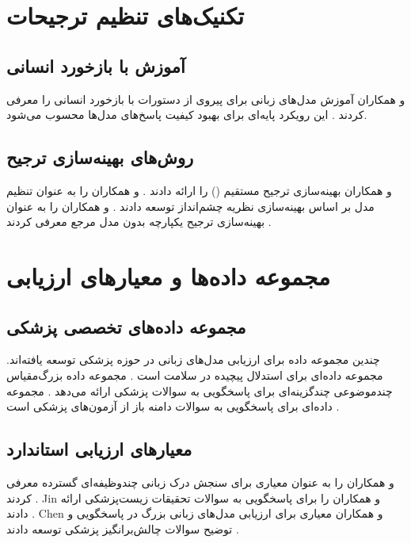 \documentclass[11pt, a4paper, oneside]{book}
\begin{document}
	
	\section{تکنیک‌های تنظیم ترجیحات}
	
	\subsection{آموزش با بازخورد انسانی}
	
	 و همکاران آموزش مدل‌های زبانی برای پیروی از دستورات با بازخورد انسانی را معرفی کردند \cite{ouyang_training_2022}. این رویکرد پایه‌ای برای بهبود کیفیت پاسخ‌های مدل‌ها محسوب می‌شود.
	
	\subsection{روش‌های بهینه‌سازی ترجیح}
	
	 و همکاران بهینه‌سازی ترجیح مستقیم () را ارائه دادند \cite{rafailov_direct_2024}.  و همکاران  را به عنوان تنظیم مدل بر اساس بهینه‌سازی نظریه چشم‌انداز توسعه دادند \cite{ethayarajh_kto_2024}.  و همکاران  را به عنوان بهینه‌سازی ترجیح یکپارچه بدون مدل مرجع معرفی کردند \cite{hong_orpo_2024}.
	
	\section{مجموعه داده‌ها و معیارهای ارزیابی}
	
	\subsection{مجموعه داده‌های تخصصی پزشکی}
	
	چندین مجموعه داده برای ارزیابی مدل‌های زبانی در حوزه پزشکی توسعه یافته‌اند.  مجموعه داده‌ای برای استدلال پیچیده در سلامت است \cite{vilares_head-qa_2019}.  مجموعه داده بزرگ‌مقیاس چندموضوعی چندگزینه‌ای برای پاسخگویی به سوالات پزشکی ارائه می‌دهد \cite{pal_medmcqa_2022}.  مجموعه داده‌ای برای پاسخگویی به سوالات دامنه باز از آزمون‌های پزشکی است \cite{jin_what_2020}.
	
	\subsection{معیارهای ارزیابی استاندارد}
	
	 و همکاران  را به عنوان معیاری برای سنجش درک زبانی چندوظیفه‌ای گسترده معرفی کردند \cite{hendrycks_measuring_2021}. Jin و همکاران  را برای پاسخگویی به سوالات تحقیقات زیست‌پزشکی ارائه دادند \cite{jin_pubmedqa_2019}. Chen و همکاران معیاری برای ارزیابی مدل‌های زبانی بزرگ در پاسخگویی و توضیح سوالات چالش‌برانگیز پزشکی توسعه دادند \cite{chen_benchmarking_2024}.
	
\end{document}
